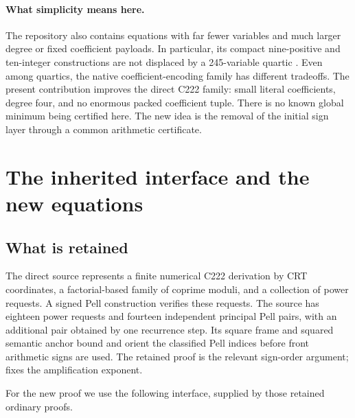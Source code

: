 \documentclass[11pt,letterpaper]{article}
\theoremstyle{remark}\newtheorem{remark}[theorem]{Remark}
\begin{document}
\paragraph{What simplicity means here.}
The repository also contains equations with far fewer variables and much
larger degree or fixed coefficient payloads. In particular, its compact
nine-positive and ten-integer constructions are not displaced by a
245-variable quartic \cite{forms,sun}. Even among quartics, the native
coefficient-encoding family has different tradeoffs. The present contribution
improves the direct C222 family: small literal coefficients, degree four,
and no enormous packed coefficient tuple. There is no known global
minimum being certified here. The new idea is the removal of the initial
sign layer through a common arithmetic certificate.

\section{The inherited interface and the new equations}

\subsection{What is retained}

The direct source represents a finite numerical C222 derivation by CRT
coordinates, a factorial-based family of coprime moduli, and a collection
of power requests. A signed Pell construction verifies these requests.
The source has eighteen power requests and fourteen independent principal
Pell pairs, with an additional pair obtained by one recurrence step.
Its square frame and squared semantic anchor bound and orient the classified
Pell indices before front arithmetic signs are used. The retained proof
 is the relevant sign-order argument;
 fixes the amplification exponent.

For the new proof we use the following interface, supplied by those retained
ordinary proofs.
\end{document}
